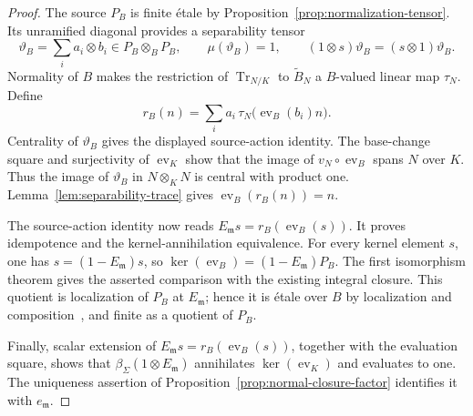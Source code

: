 \documentclass[11pt]{article}
\theoremstyle{definition}
\theoremstyle{remark}
\begin{document}
\begin{proof}
The source \(P_B\) is finite \'{e}tale by
Proposition~\ref{prop:normalization-tensor}. Its unramified diagonal
provides a separability tensor~\cite{StacksUnramifiedDiagonal}
\[
  \vartheta_B=\sum_i a_i\otimes b_i\in P_B\otimes_B P_B,
  \qquad \mu(\vartheta_B)=1,
  \qquad (1\otimes s)\vartheta_B=(s\otimes1)\vartheta_B.
\]
Normality of \(B\) makes the restriction of
\(\operatorname{Tr}_{N/K}\) to \(\widetilde B_N\) a \(B\)-valued
linear map \(\tau_N\). Define
\[
  r_B(n)=\sum_i a_i\,\tau_N\bigl(\operatorname{ev}_B(b_i)n\bigr).
\]
Centrality of \(\vartheta_B\) gives the displayed source-action
identity. The base-change square and surjectivity of
\(\operatorname{ev}_K\) show that the image of
\(v_N\circ\operatorname{ev}_B\) spans \(N\) over \(K\).
Thus the image of \(\vartheta_B\) in \(N\otimes_K N\) is central
with product one. Lemma~\ref{lem:separability-trace} gives
\(\operatorname{ev}_B(r_B(n))=n\).

The source-action identity now reads
\(E_{\mathfrak m}s=r_B(\operatorname{ev}_B(s))\).
It proves idempotence and the kernel-annihilation equivalence.
For every kernel element \(s\), one has
\(s=(1-E_{\mathfrak m})s\), so
\(\ker(\operatorname{ev}_B)=(1-E_{\mathfrak m})P_B\).
The first isomorphism theorem gives the asserted comparison with the
existing integral closure. This quotient is localization of \(P_B\)
at \(E_{\mathfrak m}\); hence it is \'{e}tale over \(B\) by
localization and composition~\cite{StacksEtaleStability}, and finite
as a quotient of \(P_B\).

Finally, scalar extension of
\(E_{\mathfrak m}s=r_B(\operatorname{ev}_B(s))\), together with the
evaluation square, shows that \(\beta_\Sigma(1\otimes E_{\mathfrak m})\)
annihilates \(\ker(\operatorname{ev}_K)\) and evaluates to one.
The uniqueness assertion of Proposition~\ref{prop:normal-closure-factor}
identifies it with \(e_{\mathfrak m}\).
\end{proof}
\end{document}
